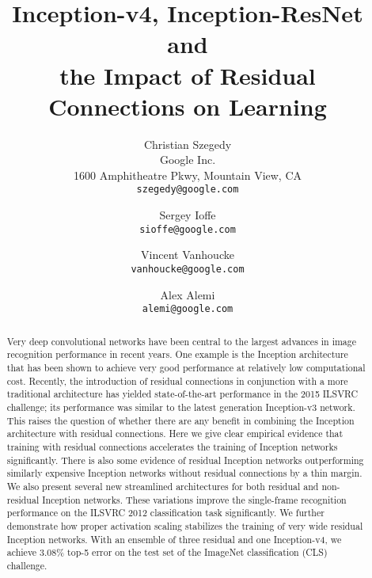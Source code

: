 \documentclass[10pt,twocolumn,letterpaper]{article}
\begin{document}
\title{Inception-v4, Inception-ResNet and\\the Impact of Residual Connections on Learning}

\author{Christian Szegedy\\
Google Inc.\\
1600 Amphitheatre Pkwy, Mountain View, CA\\
{\tt\small szegedy@google.com}
\and
Sergey Ioffe\\
{\tt\small sioffe@google.com}
\and
Vincent Vanhoucke\\
{\tt\small vanhoucke@google.com}
\and
Alex Alemi\\
{\tt\small alemi@google.com}
}

\maketitle

\begin{abstract}
Very deep convolutional networks have been central to the largest advances in image
recognition performance in recent years. One example is the Inception
architecture that has been shown to achieve very good performance at relatively
low computational cost. Recently, the introduction of residual connections
in conjunction with a more traditional architecture has yielded state-of-the-art
performance in the 2015 ILSVRC challenge; its performance was similar
to the latest generation Inception-v3 network. This raises the question of whether
there are any benefit in combining the Inception architecture with residual
connections.
Here we give clear empirical evidence that training with residual connections
accelerates the training of Inception networks significantly. There is also
some evidence of residual Inception networks outperforming similarly
expensive Inception networks without residual connections by a thin margin.
We also present several new streamlined architectures for both residual and
non-residual Inception networks. These variations improve the single-frame
recognition performance on the ILSVRC 2012 classification task significantly.
We further demonstrate how proper activation scaling stabilizes the training of
very wide residual Inception networks. With an ensemble of three residual and
one Inception-v4, we achieve 3.08\% top-5 error on the test set of
the ImageNet classification (CLS) challenge.

\end{abstract}
\end{document}
